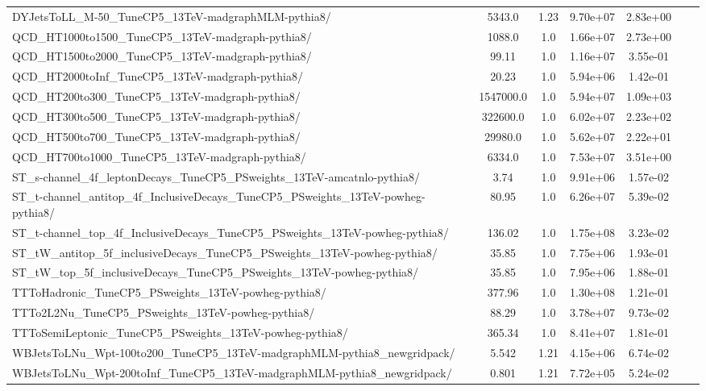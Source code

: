 \begin{table}
\begin{center}
{\begin{tabular}{|l|c|c|c|c|c|c|}
DYJetsToLL\_M-50\_TuneCP5\_13TeV-madgraphMLM-pythia8/ & 5343.0 & 1.23 & 9.70e+07 & {\color{red}2.83e+00} \\
QCD\_HT1000to1500\_TuneCP5\_13TeV-madgraph-pythia8/ & 1088.0 & 1.0 & 1.66e+07 & {\color{red}2.73e+00} \\
QCD\_HT1500to2000\_TuneCP5\_13TeV-madgraph-pythia8/ & 99.11 & 1.0 & 1.16e+07 & {\color{orange}3.55e-01} \\
QCD\_HT2000toInf\_TuneCP5\_13TeV-madgraph-pythia8/ & 20.23 & 1.0 & 5.94e+06 & 1.42e-01 \\
QCD\_HT200to300\_TuneCP5\_13TeV-madgraph-pythia8/ & 1547000.0 & 1.0 & 5.94e+07 & {\color{red}1.09e+03} \\
QCD\_HT300to500\_TuneCP5\_13TeV-madgraph-pythia8/ & 322600.0 & 1.0 & 6.02e+07 & {\color{red}2.23e+02} \\
QCD\_HT500to700\_TuneCP5\_13TeV-madgraph-pythia8/ & 29980.0 & 1.0 & 5.62e+07 & {\color{red}2.22e+01} \\
QCD\_HT700to1000\_TuneCP5\_13TeV-madgraph-pythia8/ & 6334.0 & 1.0 & 7.53e+07 & {\color{red}3.51e+00} \\
ST\_s-channel\_4f\_leptonDecays\_TuneCP5\_PSweights\_13TeV-amcatnlo-pythia8/ & 3.74 & 1.0 & 9.91e+06 & 1.57e-02 \\
ST\_t-channel\_antitop\_4f\_InclusiveDecays\_TuneCP5\_PSweights\_13TeV-powheg-pythia8/ & 80.95 & 1.0 & 6.26e+07 & 5.39e-02 \\
ST\_t-channel\_top\_4f\_InclusiveDecays\_TuneCP5\_PSweights\_13TeV-powheg-pythia8/ & 136.02 & 1.0 & 1.75e+08 & 3.23e-02 \\
ST\_tW\_antitop\_5f\_inclusiveDecays\_TuneCP5\_PSweights\_13TeV-powheg-pythia8/ & 35.85 & 1.0 & 7.75e+06 & 1.93e-01 \\
ST\_tW\_top\_5f\_inclusiveDecays\_TuneCP5\_PSweights\_13TeV-powheg-pythia8/ & 35.85 & 1.0 & 7.95e+06 & 1.88e-01 \\
TTToHadronic\_TuneCP5\_PSweights\_13TeV-powheg-pythia8/ & 377.96 & 1.0 & 1.30e+08 & 1.21e-01 \\
TTTo2L2Nu\_TuneCP5\_PSweights\_13TeV-powheg-pythia8/ & 88.29 & 1.0 & 3.78e+07 & 9.73e-02 \\
TTToSemiLeptonic\_TuneCP5\_PSweights\_13TeV-powheg-pythia8/ & 365.34 & 1.0 & 8.41e+07 & 1.81e-01 \\
WBJetsToLNu\_Wpt-100to200\_TuneCP5\_13TeV-madgraphMLM-pythia8\_newgridpack/ & 5.542 & 1.21 & 4.15e+06 & 6.74e-02 \\
WBJetsToLNu\_Wpt-200toInf\_TuneCP5\_13TeV-madgraphMLM-pythia8\_newgridpack/ & 0.801 & 1.21 & 7.72e+05 & 5.24e-02 \\

\end{tabular}}
\end{center}
\end{table}
